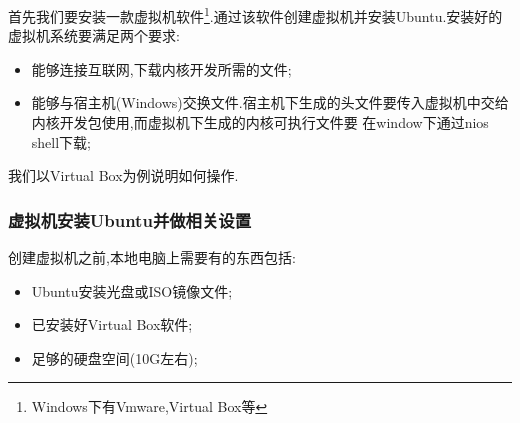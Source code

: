 \documentclass[12pt,a4paper]{article}
\begin{document}
首先我们要安装一款虚拟机软件\footnote{Windows下有Vmware,Virtual Box等}.通过该软件创建虚拟机并安装Ubuntu.安装好的虚拟机系统要满足两个要求:
\begin{itemize}
\item 能够连接互联网,下载内核开发所需的文件;
\item 能够与宿主机(Windows)交换文件.宿主机下生成的头文件要传入虚拟机中交给内核开发包使用,而虚拟机下生成的内核可执行文件要
在window下通过nios shell下载;
\end{itemize}

我们以Virtual Box为例说明如何操作.
\subsubsection{虚拟机安装Ubuntu并做相关设置}
创建虚拟机之前,本地电脑上需要有的东西包括:
\begin{itemize}
\item Ubuntu安装光盘或ISO镜像文件;
\item 已安装好Virtual Box软件;
\item 足够的硬盘空间(10G左右);
\end{itemize}
\end{document}
